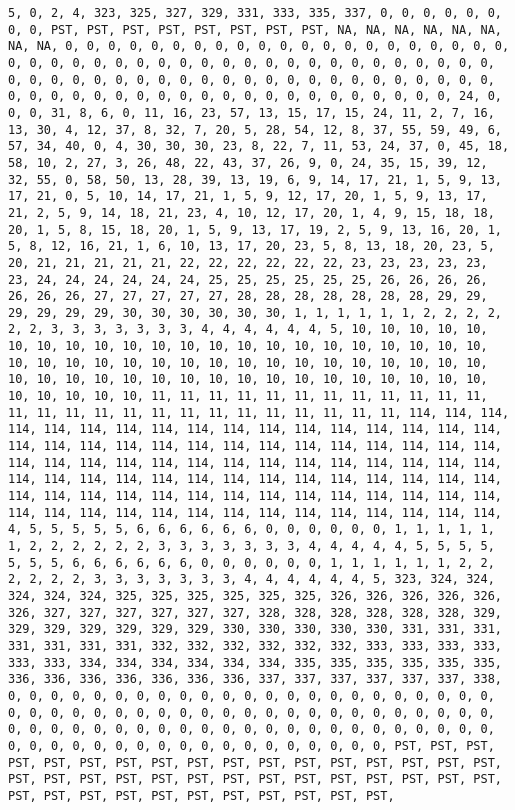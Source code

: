 \documentclass[]{article}
\begin{document}
\begin{verbatim}
5, 0, 2, 4, 323, 325, 327, 329, 331, 333, 335, 337, 0, 0, 0, 0, 0, 0, 0, 0, PST, PST, PST, PST, PST, PST, PST, PST, NA, NA, NA, NA, NA, NA, NA, NA, 0, 0, 0, 0, 0, 0, 0, 0, 0, 0, 0, 0, 0, 0, 0, 0, 0, 0, 0, 0, 0, 0, 0, 0, 0, 0, 0, 0, 0, 0, 0, 0, 0, 0, 0, 0, 0, 0, 0, 0, 0, 0, 0, 0, 0, 0, 0, 0, 0, 0, 0, 0, 0, 0, 0, 0, 0, 0, 0, 0, 0, 0, 0, 0, 0, 0, 0, 0, 0, 0, 0, 0, 0, 0, 0, 0, 0, 0, 0, 0, 0, 0, 0, 0, 0, 0, 0, 0, 24, 0, 0, 0, 31, 8, 6, 0, 11, 16, 23, 57, 13, 15, 17, 15, 24, 11, 2, 7, 16, 13, 30, 4, 12, 37, 8, 32, 7, 20, 5, 28, 54, 12, 8, 37, 55, 59, 49, 6, 57, 34, 40, 0, 4, 30, 30, 30, 23, 8, 22, 7, 11, 53, 24, 37, 0, 45, 18, 58, 10, 2, 27, 3, 26, 48, 22, 43, 37, 26, 9, 0, 24, 35, 15, 39, 12, 32, 55, 0, 58, 50, 13, 28, 39, 13, 19, 6, 9, 14, 17, 21, 1, 5, 9, 13, 17, 21, 0, 5, 10, 14, 17, 21, 1, 5, 9, 12, 17, 20, 1, 5, 9, 13, 17, 21, 2, 5, 9, 14, 18, 21, 23, 4, 10, 12, 17, 20, 1, 4, 9, 15, 18, 18, 20, 1, 5, 8, 15, 18, 20, 1, 5, 9, 13, 17, 19, 2, 5, 9, 13, 16, 20, 1, 5, 8, 12, 16, 21, 1, 6, 10, 13, 17, 20, 23, 5, 8, 13, 18, 20, 23, 5, 20, 21, 21, 21, 21, 21, 22, 22, 22, 22, 22, 22, 23, 23, 23, 23, 23, 23, 24, 24, 24, 24, 24, 24, 25, 25, 25, 25, 25, 25, 26, 26, 26, 26, 26, 26, 26, 27, 27, 27, 27, 27, 28, 28, 28, 28, 28, 28, 28, 29, 29, 29, 29, 29, 29, 30, 30, 30, 30, 30, 30, 1, 1, 1, 1, 1, 1, 2, 2, 2, 2, 2, 2, 3, 3, 3, 3, 3, 3, 3, 4, 4, 4, 4, 4, 4, 5, 10, 10, 10, 10, 10, 10, 10, 10, 10, 10, 10, 10, 10, 10, 10, 10, 10, 10, 10, 10, 10, 10, 10, 10, 10, 10, 10, 10, 10, 10, 10, 10, 10, 10, 10, 10, 10, 10, 10, 10, 10, 10, 10, 10, 10, 10, 10, 10, 10, 10, 10, 10, 10, 10, 10, 10, 10, 10, 10, 10, 10, 11, 11, 11, 11, 11, 11, 11, 11, 11, 11, 11, 11, 11, 11, 11, 11, 11, 11, 11, 11, 11, 11, 11, 11, 11, 11, 114, 114, 114, 114, 114, 114, 114, 114, 114, 114, 114, 114, 114, 114, 114, 114, 114, 114, 114, 114, 114, 114, 114, 114, 114, 114, 114, 114, 114, 114, 114, 114, 114, 114, 114, 114, 114, 114, 114, 114, 114, 114, 114, 114, 114, 114, 114, 114, 114, 114, 114, 114, 114, 114, 114, 114, 114, 114, 114, 114, 114, 114, 114, 114, 114, 114, 114, 114, 114, 114, 114, 114, 114, 114, 114, 114, 114, 114, 114, 114, 114, 114, 114, 114, 114, 114, 114, 4, 5, 5, 5, 5, 5, 6, 6, 6, 6, 6, 6, 0, 0, 0, 0, 0, 0, 1, 1, 1, 1, 1, 1, 2, 2, 2, 2, 2, 2, 3, 3, 3, 3, 3, 3, 3, 4, 4, 4, 4, 4, 5, 5, 5, 5, 5, 5, 5, 6, 6, 6, 6, 6, 6, 0, 0, 0, 0, 0, 0, 1, 1, 1, 1, 1, 1, 2, 2, 2, 2, 2, 2, 3, 3, 3, 3, 3, 3, 3, 4, 4, 4, 4, 4, 4, 5, 323, 324, 324, 324, 324, 324, 325, 325, 325, 325, 325, 325, 326, 326, 326, 326, 326, 326, 327, 327, 327, 327, 327, 327, 328, 328, 328, 328, 328, 328, 329, 329, 329, 329, 329, 329, 329, 330, 330, 330, 330, 330, 331, 331, 331, 331, 331, 331, 331, 332, 332, 332, 332, 332, 332, 333, 333, 333, 333, 333, 333, 334, 334, 334, 334, 334, 334, 335, 335, 335, 335, 335, 335, 336, 336, 336, 336, 336, 336, 336, 337, 337, 337, 337, 337, 337, 338, 0, 0, 0, 0, 0, 0, 0, 0, 0, 0, 0, 0, 0, 0, 0, 0, 0, 0, 0, 0, 0, 0, 0, 0, 0, 0, 0, 0, 0, 0, 0, 0, 0, 0, 0, 0, 0, 0, 0, 0, 0, 0, 0, 0, 0, 0, 0, 0, 0, 0, 0, 0, 0, 0, 0, 0, 0, 0, 0, 0, 0, 0, 0, 0, 0, 0, 0, 0, 0, 0, 0, 0, 0, 0, 0, 0, 0, 0, 0, 0, 0, 0, 0, 0, 0, 0, 0, PST, PST, PST, PST, PST, PST, PST, PST, PST, PST, PST, PST, PST, PST, PST, PST, PST, PST, PST, PST, PST, PST, PST, PST, PST, PST, PST, PST, PST, PST, PST, PST, PST, PST, PST, PST, PST, PST, PST, PST, PST, PST, 
\end{verbatim}
\end{document}
